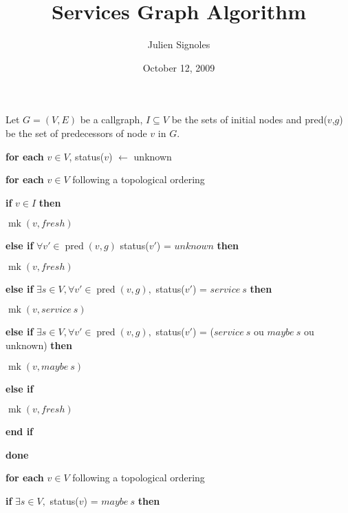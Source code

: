 \documentclass{article}
\title{Services Graph Algorithm}
\author{Julien Signoles}
\date{October 12, 2009}
\newcommand{\hs}{\hspace{4mm}}
\newcommand{\pred}[2]{\ensuremath{\operatorname{pred}(#1,#2)}}
\newcommand{\mk}[2]{\ensuremath{\operatorname{mk}(#1,#2)}}
\begin{document}
\maketitle

Let $G = (V, E)$ be a callgraph, $I \subseteq V$ be the sets of initial
nodes and pred($v$,$g$) be the set of predecessors of node $v$ in $G$.
\bigskip

\textbf{for each} $v \in V$, status($v$) $\leftarrow$ unknown

\textbf{for each} $v \in V$ following a topological ordering

  \hs \textbf{if} $v \in I$ \textbf{then} 

  \hs \hs \mk{v}{fresh}

  \hs \textbf{else if} $\forall v' \in \pred{v}{g}$ status($v'$) = $unknown$
  \textbf{then}
  
  \hs \hs \mk{v}{fresh}

  \hs \textbf{else if} $\exists s \in V,\forall v' \in \pred{v}{g},$
  status($v'$) = $service~s$ \textbf{then}
  
  \hs \hs \mk{v}{service~s}

  \hs \textbf{else if} $\exists s \in V,\forall v' \in \pred{v}{g},$
  status($v'$) = ($service~s$ ou $maybe~s$ ou unknown)  \textbf{then}
  
  \hs \hs \mk{v}{maybe~s}

  \hs \textbf{else if}
  
  \hs \hs \mk{v}{fresh}







  \hs \textbf{end if}

\textbf{done}

\textbf{for each} $v \in V$ following a topological ordering

  \hs \textbf{if} $\exists s \in V,$ status($v$) = $maybe~s$ \textbf{then}
\end{document}
